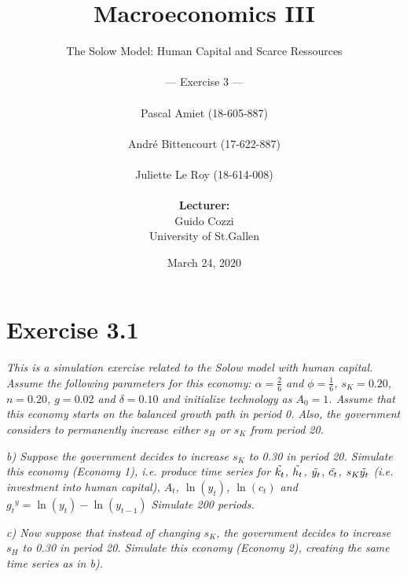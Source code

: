 \documentclass[11pt]{article} %
\begin{document}
\title{\huge{Macroeconomics III}}

\author{The Solow Model: Human Capital and Scarce Ressources\\
    \\
    --- Exercise 3 ---\\
    \\
    Pascal Amiet (18-605-887)\\
    \\
    André Bittencourt (17-622-887)\\
    \\
    Juliette Le Roy (18-614-008)\\
    \\
    \textbf{Lecturer:}\\Guido Cozzi\\
    University of St.Gallen}
\date{March 24, 2020}
\maketitle
\thispagestyle{empty}

\pagebreak
\section{Exercise 3.1}
\bigskip
\textit{This is a simulation exercise related to the Solow model with human capital.
Assume the following parameters for this economy: $\alpha = \frac{2}{6}$ and $\phi = \frac{1}{6}$, $s_K = 0.20$, $n = 0.20$, $g = 0.02$ and $\delta = 0.10$ and initialize
technology as $A_0 = 1$. Assume that this economy starts on the balanced
growth path in period 0. Also, the government considers to permanently
increase either $s_H$ or $s_K$ from period 20.}\par



\noindent\textit{b) Suppose the government decides to increase $s_K$ to 0.30 in period 20. Simulate this economy (Economy 1), i.e. produce time series for $\Tilde{k_{t}}$, $\Tilde{h_{t}}$, $\Tilde{y_{t}}$, $\Tilde{c_{t}}$, $s_K\Tilde{y_{t}}$ (i.e. investment into human capital), $A_t$, $\ln{(y_t)}$, $\ln{(c_t)}$ and ${g_t}^y = \ln{(y_t)} - \ln{(y_{t - 1})}$ Simulate 200 periods.}\par



\noindent\textit{c) Now suppose that instead of changing $s_K$, the government decides to
increase $s_H$ to 0.30 in period 20. Simulate this economy (Economy 2),
creating the same time series as in b).}\par
\end{document}
